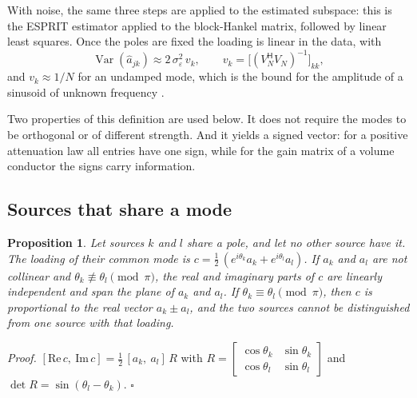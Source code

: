 \documentclass{article}
\newtheorem{proposition}{\bf Proposition}
\begin{document}
With noise, the same three steps are applied to the estimated subspace: this is the ESPRIT estimator \cite{ref-Roy, ref-Hua} applied to the block-Hankel matrix, followed by linear least squares. Once the poles are fixed the loading is linear in the data, with \[
\operatorname{Var}(\widehat{a}_{jk}) \approx 2\, \sigma_\varepsilon^{2}\, v_k, \qquad v_k = \bigl[(V_N^{\mathsf{H}} V_N)^{-1}\bigr]_{kk},
\] and $v_k \approx 1/N$ for an undamped mode, which is the bound for the amplitude of a sinusoid of unknown frequency \cite{ref-Rife}.

Two properties of this definition are used below. It does not require the modes to be orthogonal or of different strength. And it yields a signed vector: for a positive attenuation law all entries have one sign, while for the gain matrix of a volume conductor the signs carry information.

\subsection{Sources that share a mode}\label{sec:sources-that-share-a}

\begin{proposition} \label{prop:shared-mode}
Let sources $k$ and $l$ share a pole, and let no other source have it. The loading of their common mode is $c = \tfrac{1}{2}\,(e^{i\theta_k} a_k + e^{i\theta_l} a_l)$. If $a_k$ and $a_l$ are not collinear and $\theta_k \not\equiv \theta_l \pmod{\pi}$, the real and imaginary parts of $c$ are linearly independent and span the plane of $a_k$ and $a_l$. If $\theta_k \equiv \theta_l \pmod{\pi}$, then $c$ is proportional to the real vector $a_k \pm a_l$, and the two sources cannot be distinguished from one source with that loading.
\end{proposition}

\textit{Proof.} $[\mathrm{Re}\, c,\ \mathrm{Im}\, c] = \tfrac{1}{2}\,[a_k,\ a_l]\, R$ with $R = \begin{bmatrix} \cos\theta_k & \sin\theta_k \\ \cos\theta_l & \sin\theta_l \end{bmatrix}$ and $\det R = \sin(\theta_l - \theta_k)$. $\square$
\end{document}

